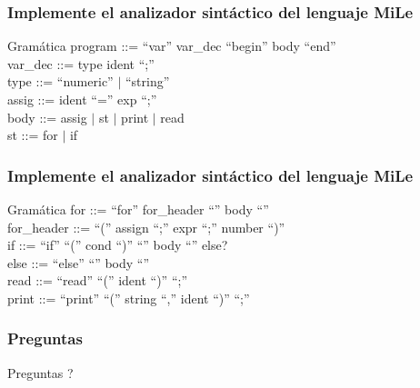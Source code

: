\documentclass{beamer}
\begin{document}
	    \begin{frame}
			\frametitle{Implemente el analizador sint\'actico del lenguaje MiLe}

			\begin{block}{Gram\'atica}
                program ::= ``var'' var\_dec ``begin'' body ``end'' \\
                \vspace{5px}
                var\_dec ::= type ident ``;'' \\
                type ::= ``numeric'' $|$ ``string''\\
                \vspace{5px}
                assig ::= ident ``='' exp ``;''\\
                body ::= assig $|$ st $|$ print $|$ read\\
                st ::= for $|$ if\\
            \end{block}
        \end{frame}

	    \begin{frame}
			\frametitle{Implemente el analizador sint\'actico del lenguaje MiLe}

			\begin{block}{Gram\'atica}
                for ::= ``for'' for\_header ``{'' body ``}''\\
                for\_header ::= ``('' assign ``;'' expr ``;'' number ``)''\\
                \vspace{5px}
                if ::= ``if'' ``('' cond ``)'' ``{'' body ``}'' else?\\
                else ::= ``else'' ``{'' body ``}''\\
                \vspace{5px}
                read ::= ``read'' ``('' ident ``)'' ``;''\\
                print ::= ``print'' ``('' string ``,'' ident ``)'' ``;''\\
            \end{block}
        \end{frame}

		\begin{frame}
			\frametitle{Preguntas}

			\hspace{4cm}\huge{Preguntas ?}
		
		\end{frame}
	
\end{document}
